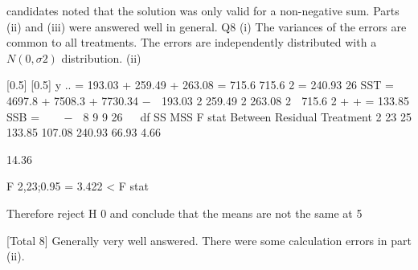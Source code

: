 \documentclass[a4paper,12pt]{article}
\begin{document}
candidates noted that the solution was only valid for a non-negative
sum. Parts (ii) and (iii) were answered well in general.
Q8
(i)
The variances of the errors are common to all treatments.
The errors are independently distributed
with a $N(0,\sigma 2 )$ distribution.
(ii)

[0.5]
[0.5]
y .. = 193.03 + 259.49 + 263.08 = 715.6
715.6 2
= 240.93
26
SST = 4697.8 + 7508.3 + 7730.34 −
 193.03 2 259.49 2 263.08 2  715.6 2
+
+
= 133.85
SSB = 
  −

8
9
9
26


df
SS
MSS
F stat
Between
Residual
Treatment
2
23
25
133.85
107.08
240.93
66.93
4.66


14.36

F 2,23;0.95
= 3.422 < F stat

Therefore reject H 0 and conclude that the means are not the same at 5%

[Total 8]
Generally very well answered. There were some calculation errors in
part (ii).
\end{document}
